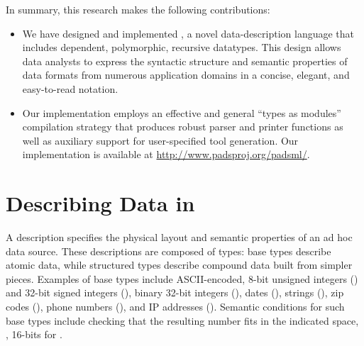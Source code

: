 \documentclass{sigplanconf}
\begin{document}


In summary, this research makes the following contributions:
\begin{itemize}
\item We have designed and implemented \padsml{}, a novel
data-description language that includes 
dependent, polymorphic, recursive datatypes.  This design
allows data analysts to express the syntactic
structure and semantic properties of data formats from numerous
application domains in a concise, elegant, and easy-to-read notation.  
\item Our \padsml{} implementation employs an effective and
general ``types as modules'' compilation strategy
that produces robust parser and printer functions
as well as auxiliary support for user-specified tool generation.
Our implementation is available
at \url{http://www.padsproj.org/padsml/}.
\end{itemize}




% 
\section{Describing Data in \padsmlbig{}}
\label{sec:padsml-overview}

A \padsml{} description specifies the physical layout and semantic
properties of an ad hoc data source.  These descriptions are composed
of types: base types describe atomic data, while structured types
describe compound data built from simpler pieces.  Examples of base
types include ASCII-encoded, 8-bit unsigned integers () and
32-bit signed integers (), binary 32-bit integers (),
dates (), strings (), zip codes (),
phone numbers (), and IP addresses ().  Semantic
conditions for such base types include checking 
that the resulting number fits in the indicated space, \ie, 16-bits
for .
\end{document}
